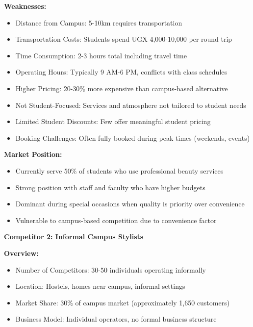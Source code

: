 \documentclass[a4paper,12pt]{article}
\begin{document}
\textbf{Weaknesses:}
\begin{itemize}[leftmargin=2em]
    \item Distance from Campus: 5-10km requires transportation
    \item Transportation Costs: Students spend UGX 4,000-10,000 per round trip
    \item Time Consumption: 2-3 hours total including travel time
    \item Operating Hours: Typically 9 AM-6 PM, conflicts with class schedules
    \item Higher Pricing: 20-30\% more expensive than campus-based alternative
    \item Not Student-Focused: Services and atmosphere not tailored to student needs
    \item Limited Student Discounts: Few offer meaningful student pricing
    \item Booking Challenges: Often fully booked during peak times (weekends, events)
\end{itemize}

\textbf{Market Position:}
\begin{itemize}[leftmargin=2em]
    \item Currently serve 50\% of students who use professional beauty services
    \item Strong position with staff and faculty who have higher budgets
    \item Dominant during special occasions when quality is priority over convenience
    \item Vulnerable to campus-based competition due to convenience factor
\end{itemize}

\vspace{1em}

\textbf{Competitor 2: Informal Campus Stylists}

\textbf{Overview:}
\begin{itemize}[leftmargin=2em]
    \item Number of Competitors: 30-50 individuals operating informally
    \item Location: Hostels, homes near campus, informal settings
    \item Market Share: 30\% of campus market (approximately 1,650 customers)
    \item Business Model: Individual operators, no formal business structure
\end{itemize}
\end{document}
